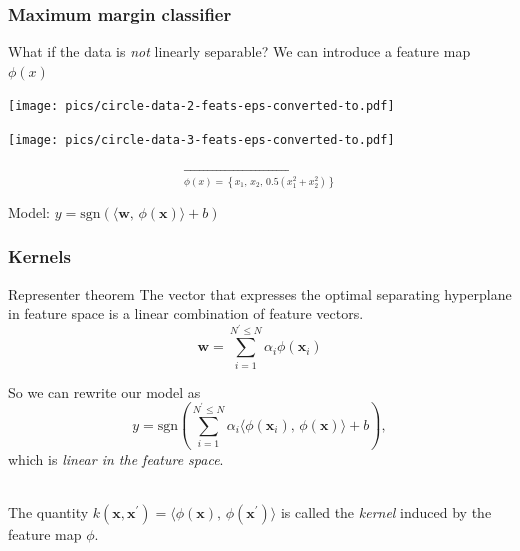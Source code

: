 \documentclass{beamer}
\begin{document}
    \begin{frame}
        \frametitle{Maximum margin classifier}
    
        What if the data is \emph{not} linearly separable? We can introduce a feature map $\phi\left( x \right)$

        \begin{center}
        \begin{minipage}{.4\textwidth}
            \centering
            \texttt{[image: pics/circle-data-2-feats-eps-converted-to.pdf]}
        \end{minipage}
        \begin{minipage}{.48\textwidth}
            \centering
            \texttt{[image: pics/circle-data-3-feats-eps-converted-to.pdf]}
        \end{minipage}
        \[
            \xrightarrow[\phi\left( x \right)=\left\{x_1,\, x_2,\, 0.5 \left( x_1^2 + x_2^2 \right)\right\}]{}
            \]
        \end{center}

        Model: $y=\text{sgn}\left( \langle \mathbf{w},\, \phi\left( \mathbf{x} \right)\rangle + b \right) $
    
    \end{frame}

    \begin{frame}
        \frametitle{Kernels}

        \begin{block}{Representer theorem}
            The vector that expresses the optimal separating hyperplane in feature space is a linear combination of feature vectors.
            \[
                \mathbf{w} = \sum_{i=1}^{N^\prime \leq N} \alpha_i \phi\left( \mathbf{x}_i \right)
            \]
            
        \end{block}

        \pause
        So we can rewrite our model as
        \[y=\text{sgn}\left( \sum_{i=1}^{N^\prime \leq N} \alpha_i \langle \phi\left( \mathbf{x}_i \right),\, \phi\left( \mathbf{x} \right)\rangle + b \right),\]
        which is \emph{linear in the feature space}.

        \ \\
        The quantity $k\left( \mathbf{x}, \mathbf{x}^\prime \right)=\langle \phi\left( \mathbf{x} \right),\, \phi\left( \mathbf{x}^\prime \right)\rangle$ is called the \emph{kernel} induced by the feature map $\phi$.
    
    
    \end{frame}
\end{document}
